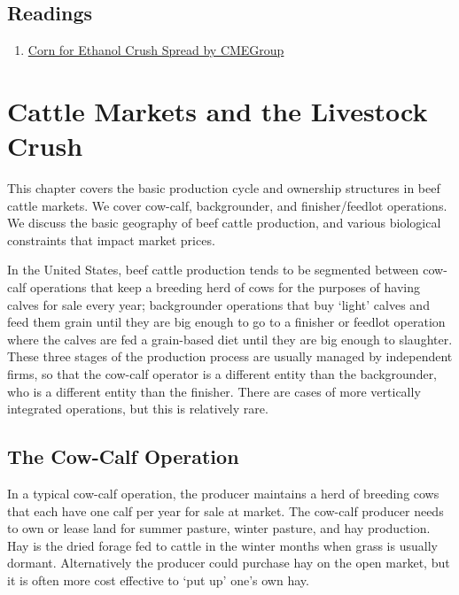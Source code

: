 \documentclass[
]{book}
\providecommand{\tightlist}{%
  \setlength{\itemsep}{0pt}\setlength{\parskip}{0pt}}
\begin{document}
\hypertarget{readings-5}{%
\section{Readings}\label{readings-5}}

\begin{enumerate}
\def\labelenumi{\arabic{enumi}.}
\tightlist
\item
  \href{http://www.cmegroup.com/trading/agricultural/files/AC-406_DDG_CornCrush_042010.pdf}{Corn for Ethanol Crush Spread by CMEGroup}
\end{enumerate}

\hypertarget{cattle-markets-and-the-livestock-crush}{%
\chapter{Cattle Markets and the Livestock Crush}\label{cattle-markets-and-the-livestock-crush}}

This chapter covers the basic production cycle and ownership structures in beef cattle markets. We cover cow-calf, backgrounder, and finisher/feedlot operations. We discuss the basic geography of beef cattle production, and various biological constraints that impact market prices.

In the United States, beef cattle production tends to be segmented between cow-calf operations that keep a breeding herd of cows for the purposes of having calves for sale every year; backgrounder operations that buy `light' calves and feed them grain until they are big enough to go to a finisher or feedlot operation where the calves are fed a grain-based diet until they are big enough to slaughter. These three stages of the production process are usually managed by independent firms, so that the cow-calf operator is a different entity than the backgrounder, who is a different entity than the finisher. There are cases of more vertically integrated operations, but this is relatively rare.

\hypertarget{the-cow-calf-operation}{%
\section{The Cow-Calf Operation}\label{the-cow-calf-operation}}

In a typical cow-calf operation, the producer maintains a herd of breeding cows that each have one calf per year for sale at market. The cow-calf producer needs to own or lease land for summer pasture, winter pasture, and hay production. Hay is the dried forage fed to cattle in the winter months when grass is usually dormant. Alternatively the producer could purchase hay on the open market, but it is often more cost effective to `put up' one's own hay.
\end{document}
